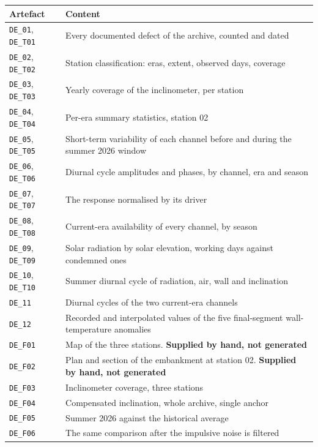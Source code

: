 \documentclass[11pt,a4paper]{article}
\begin{document}
\begin{table}[H]
\centering
\small
\begin{tabularx}{\textwidth}{L{4.6cm}Y}
\toprule
\textbf{Artefact} & \textbf{Content} \\
\midrule
\texttt{DE\_01}, \texttt{DE\_T01} & Every documented defect of the archive,
counted and dated \\
\texttt{DE\_02}, \texttt{DE\_T02} & Station classification: eras, extent,
observed days, coverage \\
\texttt{DE\_03}, \texttt{DE\_T03} & Yearly coverage of the inclinometer, per
station \\
\texttt{DE\_04}, \texttt{DE\_T04} & Per-era summary statistics, station 02 \\
\texttt{DE\_05}, \texttt{DE\_T05} & Short-term variability of each channel before
and during the summer 2026 window \\
\texttt{DE\_06}, \texttt{DE\_T06} & Diurnal cycle amplitudes and phases, by
channel, era and season \\
\texttt{DE\_07}, \texttt{DE\_T07} & The response normalised by its driver \\
\texttt{DE\_08}, \texttt{DE\_T08} & Current-era availability of every channel, by
season \\
\texttt{DE\_09}, \texttt{DE\_T09} & Solar radiation by solar elevation, working
days against condemned ones \\
\texttt{DE\_10}, \texttt{DE\_T10} & Summer diurnal cycle of radiation, air, wall
and inclination \\
\texttt{DE\_11} & Diurnal cycles of the two current-era channels \\
\texttt{DE\_12} & Recorded and interpolated values of the five final-segment
wall-temperature anomalies \\
\addlinespace
\texttt{DE\_F01} & Map of the three stations. \textbf{Supplied by hand, not
generated} \\
\texttt{DE\_F02} & Plan and section of the embankment at station 02.
\textbf{Supplied by hand, not generated} \\
\texttt{DE\_F03} & Inclinometer coverage, three stations \\
\texttt{DE\_F04} & Compensated inclination, whole archive, single anchor \\
\texttt{DE\_F05} & Summer 2026 against the historical average \\
\texttt{DE\_F06} & The same comparison after the impulsive noise is filtered \\

\end{tabularx}
\end{table}
\end{document}
